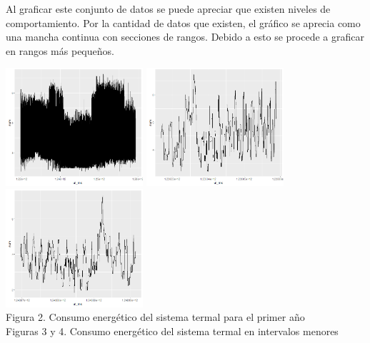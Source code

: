 \documentclass[../Main.tex]{subfiles}
\begin{document}
Al graficar este conjunto de datos se puede apreciar que existen niveles de comportamiento. Por la cantidad de datos que existen, el gráfico se aprecia como una mancha continua con secciones de rangos. Debido a esto se procede a graficar en rangos más pequeños.

\begin{center}
\includegraphics[width=2in]{Assets/power1SumAll.png}
\includegraphics[width=2in]{Assets/power1Sum5hk1k.png}
\includegraphics[width=2in]{Assets/power1Sum9hk1k.png}
\\Figura 2. Consumo energético del sistema termal para el primer año
\\Figuras 3 y 4. Consumo energético del sistema termal en intervalos menores
\end{center}
\end{document}
